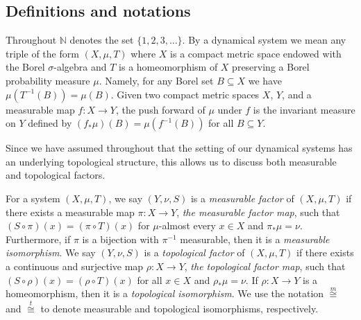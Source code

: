 \documentclass[12pt]{amsart}
\theoremstyle{definition}
\theoremstyle{plain}
\theoremstyle{definition}
\numberwithin{equation}{section}
\begin{document}
\subsection{Definitions and notations}\label{definition}
Throughout $\mathbb{N}$ denotes the set $\{1,2, 3, \dots \}$. By a dynamical system we mean any triple of the form $(X, \mu, T)$ where $X$ is a compact metric space endowed with the Borel $\sigma$-algebra and $T$ is a homeomorphism of $X$ preserving a Borel probability measure $\mu$. Namely, for any Borel set $B \subseteq X$ we have $\mu(T^{-1}(B))=\mu(B).$ Given two compact metric spaces $X$, $Y$, and a measurable map $f\colon X \rightarrow Y$, the push forward of $\mu$ under $f$ is the invariant measure on $Y$ defined by $(f_{*}\mu)(B)=\mu(f^{-1}(B))$ for all $B \subseteq Y$.



Since we have assumed throughout that the setting of our dynamical systems has an underlying topological structure, this allows us to discuss both measurable and topological factors.




    For a system $(X,\mu,T)$, we say $(Y,\nu,S)$ is a \textit{measurable factor} of $(X,\mu,T)$ if there exists a measurable map $\pi\colon X \rightarrow Y$, \textit{the measurable factor map}, such that $(S \circ \pi)(x)= (\pi \circ T)(x)$ for $\mu$-almost every $x \in X$ and $\pi_{*} \mu=\nu.$ Furthermore, if $\pi$ is a bijection with $\pi^{-1}$ measurable, then it is a \textit{measurable isomorphism}. We say $(Y, \nu, S)$ is a \textit{topological factor} of $(X, \mu, T)$ if there exists a continuous and surjective map $\rho\colon X \rightarrow Y$, \textit{the topological factor map}, such that $(S \circ \rho)(x)= (\rho \circ T)(x)$ for all $x\in X$ and $\rho_{*}  \mu=\nu.$ If $\rho\colon X \rightarrow Y$ is a homeomorphism, then it is a \textit{topological isomorphism}. We use the notation $\overset{m}\cong$ and $\overset{t}\cong$ to denote measurable and topological isomorphisms, respectively. 


\end{document}
